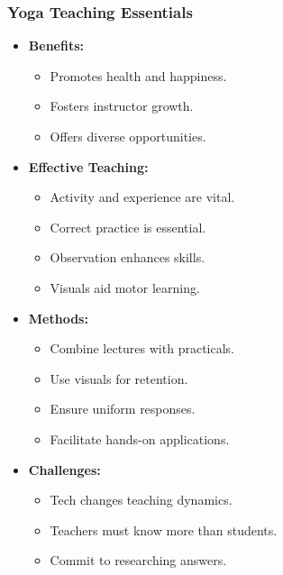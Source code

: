 \begin{frame}[fragile]\frametitle{Yoga Teaching Essentials}

    \begin{itemize}
        \item \textbf{Benefits:} 
          \begin{itemize}
              \item Promotes health and happiness.
              \item Fosters instructor growth.
              \item Offers diverse opportunities.
          \end{itemize}

        \item \textbf{Effective Teaching:} 
          \begin{itemize}
              \item Activity and experience are vital.
              \item Correct practice is essential.
              \item Observation enhances skills.
              \item Visuals aid motor learning.
          \end{itemize}

        \item \textbf{Methods:} 
          \begin{itemize}
              \item Combine lectures with practicals.
              \item Use visuals for retention.
              \item Ensure uniform responses.
              \item Facilitate hands-on applications.
          \end{itemize}

        \item \textbf{Challenges:} 
          \begin{itemize}
              \item Tech changes teaching dynamics.
              \item Teachers must know more than students.
              \item Commit to researching answers.
          \end{itemize}

    \end{itemize}

\end{frame}


